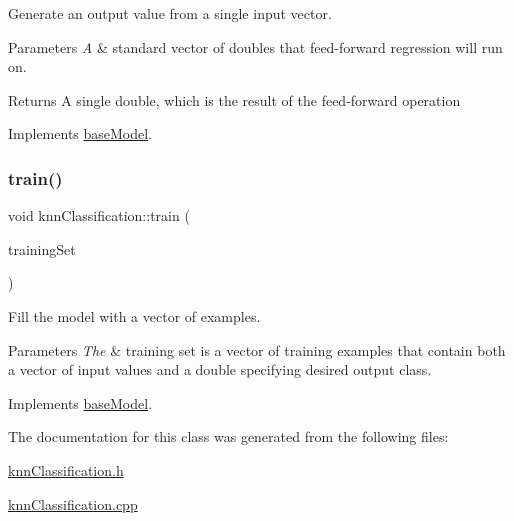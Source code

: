 Generate an output value from a single input vector. 
\begin{DoxyParams}{Parameters}
{\em A} & standard vector of doubles that feed-\/forward regression will run on. \\
\hline
\end{DoxyParams}
\begin{DoxyReturn}{Returns}
A single double, which is the result of the feed-\/forward operation 
\end{DoxyReturn}


Implements \hyperlink{classbase_model_a07d92b944728ff2b3339d6bceaecb6a3}{base\+Model}.

\mbox{\label{classknn_classification_ae159e53f542d08d04c76760f2e25e843}} 
\subsubsection{\texorpdfstring{train()}{train()}}
{\footnotesize\ttfamily void knn\+Classification\+::train (\begin{DoxyParamCaption}\item[{std\+::vector$<$ \hyperlink{structtraining_example}{training\+Example} $>$}]{training\+Set }\end{DoxyParamCaption})\hspace{0.3cm}{\ttfamily [virtual]}}

Fill the model with a vector of examples.


\begin{DoxyParams}{Parameters}
{\em The} & training set is a vector of training examples that contain both a vector of input values and a double specifying desired output class. \\
\hline
\end{DoxyParams}


Implements \hyperlink{classbase_model_aed9192d6c0f17a1816a55b077baf2523}{base\+Model}.



The documentation for this class was generated from the following files\+:\begin{DoxyCompactItemize}
\item 
\hyperlink{knn_classification_8h}{knn\+Classification.\+h}\item 
\hyperlink{knn_classification_8cpp}{knn\+Classification.\+cpp}\end{DoxyCompactItemize}
